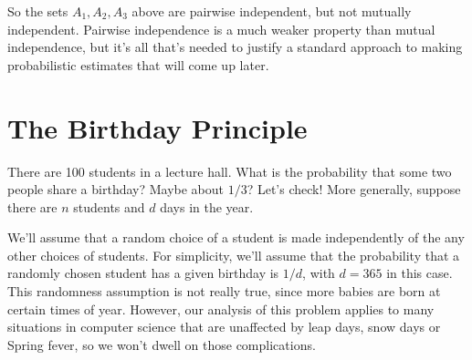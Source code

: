 So the sets $A_1,A_2,A_3$ above are pairwise independent, but not mutually
independent.  Pairwise independence is a much weaker property than mutual
independence, but it's all that's needed to justify a standard approach to
making probabilistic estimates that will come up later.

\begin{problems}
\classproblems
{}
\end{problems}


\section{The Birthday Principle}\label{birthday_principle_sec}

There are 100 students in a lecture hall.  What is the probability that
some two people share a birthday?  Maybe about $1/3$?  Let's check!  More
generally, suppose there are $n$ students and $d$ days in the year.

We'll assume that a random choice of a student is made independently of
the any other choices of students.  For simplicity, we'll assume that the
probability that a randomly chosen student has a given birthday is $1/d$,
with $d= 365$ in this case.  This randomness assumption is not really
true, since more babies are born at certain times of year.  However, our
analysis of this problem applies to many situations in computer science
that are unaffected by leap days, snow days or Spring fever, so we won't
dwell on those complications.

